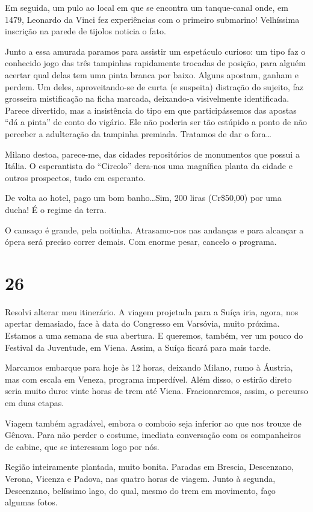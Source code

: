 Em seguida, um pulo ao local em que se encontra um tanque-canal onde, em 1479, Leonardo da Vinci fez experiências com o primeiro submarino! Velhíssima inscrição na parede de tijolos noticia o fato.

Junto a essa amurada paramos para assistir um espetáculo curioso: um tipo faz o conhecido jogo das três tampinhas rapidamente trocadas de posição, para alguém acertar qual delas tem uma pinta branca por baixo. Alguns apostam, ganham e perdem. Um deles, aproveitando-se de curta (e suspeita) distração do sujeito, faz grosseira mistificação na ficha marcada, deixando-a visivelmente identificada. Parece divertido, mas a insistência do tipo em que participássemos das apostas ``dá a pinta'' de conto do vigário. Ele não poderia ser tão estúpido a ponto de não perceber a adulteração da tampinha premiada. Tratamos de dar o fora\ldots

Milano destoa, parece-me, das cidades repositórios de monumentos que possui a Itália. O esperantista do ``Circolo'' dera-nos uma magnífica planta da cidade e outros prospectos, tudo em esperanto.

De volta ao hotel, pago um bom banho\ldots Sim, 200 liras (Cr\$50,00) por uma ducha! É o regime da terra.

O cansaço é grande, pela noitinha. Atrasamo-nos nas andanças e para alcançar a ópera será preciso correr demais. Com enorme pesar, cancelo o programa.

\section*{26 \adfflatleafright {}}
Resolvi alterar meu itinerário. A viagem projetada para a Suíça iria, agora, nos apertar demasiado, face à data do Congresso em Varsóvia, muito próxima. Estamos a uma semana de sua abertura. E queremos, também, ver um pouco do Festival da Juventude, em Viena. Assim, a Suíça ficará para mais tarde.

Marcamos embarque para hoje às 12 horas, deixando Milano, rumo à Áustria, mas com escala em Veneza, programa imperdível. Além disso, o estirão direto seria muito duro: vinte horas de trem até Viena. Fracionaremos, assim, o percurso em duas etapas.

Viagem também agradável, embora o comboio seja inferior ao que nos trouxe de Gênova. Para não perder o costume, imediata conversação com os companheiros de cabine, que se interessam logo por nós.

Região inteiramente plantada, muito bonita. Paradas em Brescia, Descenzano, Verona, Vicenza e Padova, nas quatro horas de viagem. Junto à segunda, Descenzano, belíssimo lago, do qual, mesmo do trem em movimento, faço algumas fotos.

